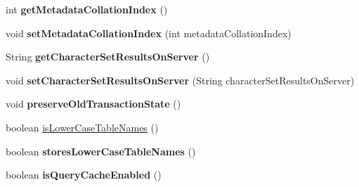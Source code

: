 \begin{DoxyCompactItemize}
\mbox{\label{classcom_1_1mysql_1_1cj_1_1protocol_1_1a_1_1_native_server_session_ab7cb9e9b9e758a4bea17d5a7e3889463}} 
int {\bfseries get\+Metadata\+Collation\+Index} ()
\item 
\mbox{\label{classcom_1_1mysql_1_1cj_1_1protocol_1_1a_1_1_native_server_session_ac50b43fb6e344f4b040cad7131f84ed6}} 
void {\bfseries set\+Metadata\+Collation\+Index} (int metadata\+Collation\+Index)
\item 
\mbox{\label{classcom_1_1mysql_1_1cj_1_1protocol_1_1a_1_1_native_server_session_a6a563b249faf740d89dc4cf8be9dd0c7}} 
String {\bfseries get\+Character\+Set\+Results\+On\+Server} ()
\item 
\mbox{\label{classcom_1_1mysql_1_1cj_1_1protocol_1_1a_1_1_native_server_session_a8b4347b3013dbe54d67b318815008340}} 
void {\bfseries set\+Character\+Set\+Results\+On\+Server} (String character\+Set\+Results\+On\+Server)
\item 
\mbox{\label{classcom_1_1mysql_1_1cj_1_1protocol_1_1a_1_1_native_server_session_a17eedbc99f68f8306dd9855c7f55c5ec}} 
void {\bfseries preserve\+Old\+Transaction\+State} ()
\item 
boolean \mbox{\hyperlink{classcom_1_1mysql_1_1cj_1_1protocol_1_1a_1_1_native_server_session_a4409c3413cfab0fe0ce91af5d4c05454}{is\+Lower\+Case\+Table\+Names}} ()
\item 
\mbox{\label{classcom_1_1mysql_1_1cj_1_1protocol_1_1a_1_1_native_server_session_ab4ff668a507b74d55b1a67a47e983660}} 
boolean {\bfseries stores\+Lower\+Case\+Table\+Names} ()
\item 
\mbox{\label{classcom_1_1mysql_1_1cj_1_1protocol_1_1a_1_1_native_server_session_a60bae77bcda04aac21fbbc5a029b8174}} 
boolean {\bfseries is\+Query\+Cache\+Enabled} ()
\item 

\end{DoxyCompactItemize}
